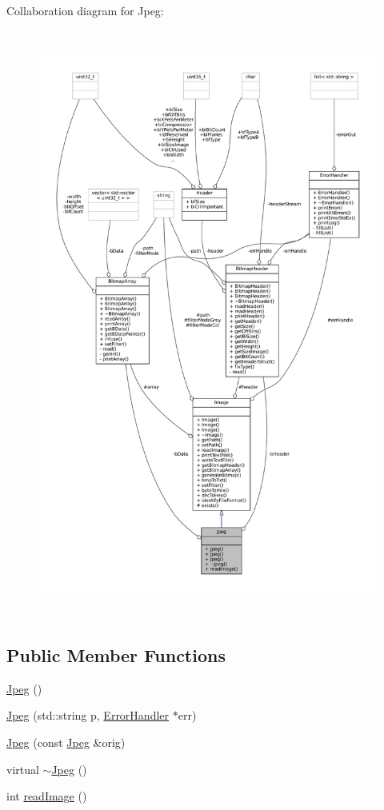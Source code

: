 Collaboration diagram for Jpeg\+:
\nopagebreak
\begin{figure}[H]
\begin{center}
\leavevmode
\includegraphics[height=550pt]{classJpeg__coll__graph}
\end{center}
\end{figure}
\subsection*{Public Member Functions}
\begin{DoxyCompactItemize}
\item 
\mbox{\hyperlink{classJpeg_aa6712899740d8d3d8789efe83aeeffac}{Jpeg}} ()
\item 
\mbox{\hyperlink{classJpeg_a8c226ee5074c5058b96b918b99e4a531}{Jpeg}} (std\+::string p, \mbox{\hyperlink{classErrorHandler}{Error\+Handler}} $\ast$err)
\item 
\mbox{\hyperlink{classJpeg_abc02dc366057e25e538b8c76c5463554}{Jpeg}} (const \mbox{\hyperlink{classJpeg}{Jpeg}} \&orig)
\item 
virtual \mbox{\hyperlink{classJpeg_aa03b879cc5185f52c4c9e39faf03db85}{$\sim$\+Jpeg}} ()
\item 
int \mbox{\hyperlink{classJpeg_a80db9e22efc544e32145b6743b2b407c}{read\+Image}} ()
\end{DoxyCompactItemize}
